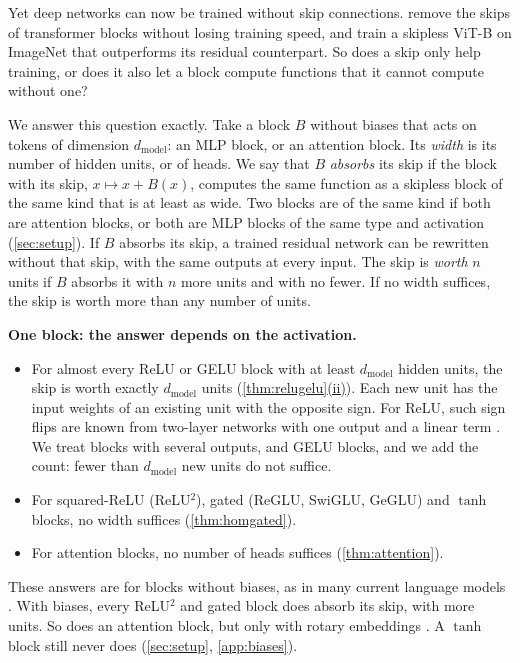 \documentclass[10pt]{article}
\theoremstyle{definition}
\theoremstyle{remark}
\newcommand{\dm}{d_{\mathrm{model}}}
\newcommand{\para}[1]{\smallskip\noindent\textbf{#1}\hspace{0.5em}}
\DeclareRobustCommand{\cpref}[2]{\hyperref[#1:#2]{\cref*{#1}(#2)}}
\begin{document}
Yet deep networks can now be trained without skip connections. \citet{he2024simplifying} remove the skips of transformer blocks without losing training speed, and \citet{ji2026cutting} train a skipless ViT-B on ImageNet that outperforms its residual counterpart. So does a skip only help training, or does it also let a block compute functions that it cannot compute without one?

We answer this question exactly. Take a block $B$ without biases that acts on tokens of dimension $\dm$: an MLP block, or an attention block. Its \emph{width} is its number of hidden units, or of heads. We say that $B$ \emph{absorbs} its skip if the block with its skip, $x \mapsto x + B(x)$, computes the same function as a skipless block of the same kind that is at least as wide. Two blocks are of the same kind if both are attention blocks, or both are MLP blocks of the same type and activation (\cref{sec:setup}). If $B$ absorbs its skip, a trained residual network can be rewritten without that skip, with the same outputs at every input. The skip is \emph{worth} $n$ units if $B$ absorbs it with $n$ more units and with no fewer. If no width suffices, the skip is worth more than any number of units.

\para{One block: the answer depends on the activation.}
\begin{itemize}
\item For almost every ReLU or GELU block with at least $\dm$ hidden units, the skip is worth exactly $\dm$ units (\cpref{thm:relugelu}{ii}). Each new unit has the input weights of an existing unit with the opposite sign. For ReLU, such sign flips are known from two-layer networks with one output and a linear term \citep{petzka2020symmetries}. We treat blocks with several outputs, and GELU blocks, and we add the count: fewer than $\dm$ new units do not suffice.
\item For squared-ReLU (ReLU$^2$), gated (ReGLU, SwiGLU, GeGLU) and $\tanh$ blocks, no width suffices (\cref{thm:homgated}).
\item For attention blocks, no number of heads suffices (\cref{thm:attention}).
\end{itemize}
These answers are for blocks without biases, as in many current language models \citep{olmo2025olmo2,yang2025qwen3}. With biases, every ReLU$^2$ and gated block does absorb its skip, with more units. So does an attention block, but only with rotary embeddings \citep{su2021roformer}. A $\tanh$ block still never does (\cref{sec:setup}, \cref{app:biases}).
\end{document}
